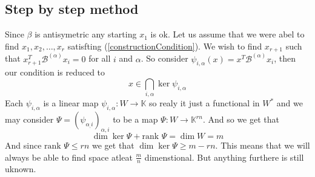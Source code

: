 \documentclass{article}
\newcommand{\B}{\mathcal{B}}
\newcommand{\Ba}{\mathcal{B}^{(\alpha)}}
\begin{document}
\subsection{Step by step method}

Since $\beta$ is antisymetric any starting $x_1$ is ok. Let us assume that we were abel to find $x_1, x_2,\ldots, x_r$ satisfting (\ref{constructionCondition}). We wish to find $x_{r+1}$ such that 
$x_{r+1}^T\B^{(\alpha)}x_i = 0$ for all $i$ and $\alpha$. So consider $\psi_{i,\alpha}(x)= x^T\Ba x_i$, then our condition is reduced to \[x \in \bigcap_{i,\alpha}\ker \psi_{i,\alpha}\]
Each $\psi_{i,\alpha }$ is a linear map $\psi_{i,\alpha} : W \to \mathbb{K}$ so realy it just a functional in $W^{*}$ and we may consider $\Psi = (\psi_{\alpha_,i})_{\alpha,i}$ to be a map $\Psi : W \to \mathbb{K}^{rn}$. And so we get that
\[\dim\ker \Psi + \text{rank }\Psi = \dim W =m \]
And since $\text{rank }\Psi \leq rn$ we get that $\dim \ker \Psi  \geq m -rn$. This means that we will always be able to find space atleat $\frac{m}{n}$ dimenstional. But anything furthere is still uknown.
\end{document}
